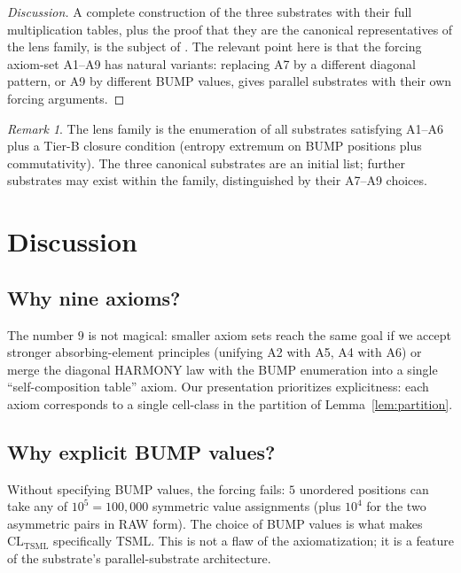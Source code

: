 \documentclass[11pt,reqno]{amsart}
\theoremstyle{plain}
\theoremstyle{definition}
\theoremstyle{remark}
\newtheorem*{remark}{Remark}
\newcommand{\TSML}{\mathrm{TSML}}
\begin{document}
\begin{proof}[Discussion]
A complete construction of the three substrates with their full
multiplication tables, plus the proof that they are the canonical
representatives of the lens family, is the subject of
\cite{SandersGishThreeSubstrate}. The relevant point here is that the
forcing axiom-set A1--A9 has natural variants: replacing A7 by a
different diagonal pattern, or A9 by different BUMP values, gives
parallel substrates with their own forcing arguments.
\end{proof}

\begin{remark}
The lens family is the enumeration of all substrates satisfying A1--A6
plus a Tier-B closure condition (entropy extremum on BUMP positions
plus commutativity). The three canonical substrates are an initial
list; further substrates may exist within the family, distinguished
by their A7--A9 choices.
\end{remark}

\section{Discussion}
\label{sec:discussion}

\subsection{Why nine axioms?}
The number $9$ is not magical: smaller axiom sets reach the same goal
if we accept stronger absorbing-element principles
(unifying A2 with A5, A4 with A6) or merge the diagonal
HARMONY law with the BUMP enumeration into a single
``self-composition table'' axiom. Our presentation prioritizes
explicitness: each axiom corresponds to a single cell-class in the
partition of Lemma~\ref{lem:partition}.

\subsection{Why explicit BUMP values?}
Without specifying BUMP values, the forcing fails: $5$ unordered
positions can take any of $10^5 = 100,000$ symmetric value assignments
(plus $10^4$ for the two asymmetric pairs in RAW form). The choice of
BUMP values is what makes $\mathrm{CL}_\TSML$ specifically TSML.
This is not a flaw of the axiomatization; it is a feature of the
substrate's parallel-substrate architecture.
\end{document}

